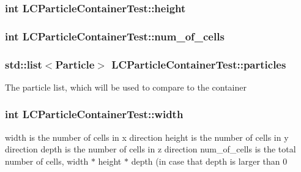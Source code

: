 \hypertarget{classLCParticleContainerTest_a4699b4535369eb36b5d711e8b45f1da6}{
\subsubsection[{height}]{\setlength{\rightskip}{0pt plus 5cm}int L\-C\-Particle\-Container\-Test\-::height\hspace{0.3cm}{\ttfamily [private]}}}\label{classLCParticleContainerTest_a4699b4535369eb36b5d711e8b45f1da6}
\hypertarget{classLCParticleContainerTest_a0d6b84232285d9630677586bb999a258}{
\subsubsection[{num\-\_\-of\-\_\-cells}]{\setlength{\rightskip}{0pt plus 5cm}int L\-C\-Particle\-Container\-Test\-::num\-\_\-of\-\_\-cells\hspace{0.3cm}{\ttfamily [private]}}}\label{classLCParticleContainerTest_a0d6b84232285d9630677586bb999a258}
\hypertarget{classLCParticleContainerTest_a9b0a10a86578860c76d2da5da0614e22}{
\subsubsection[{particles}]{\setlength{\rightskip}{0pt plus 5cm}std\-::list$<${\bf Particle}$>$ L\-C\-Particle\-Container\-Test\-::particles\hspace{0.3cm}{\ttfamily [private]}}}\label{classLCParticleContainerTest_a9b0a10a86578860c76d2da5da0614e22}
The particle list, which will be used to compare to the container \hypertarget{classLCParticleContainerTest_a72378a90a56e81786578f90afcd41b39}{
\subsubsection[{width}]{\setlength{\rightskip}{0pt plus 5cm}int L\-C\-Particle\-Container\-Test\-::width\hspace{0.3cm}{\ttfamily [private]}}}\label{classLCParticleContainerTest_a72378a90a56e81786578f90afcd41b39}
width is the number of cells in x direction height is the number of cells in y direction depth is the number of cells in z direction num\-\_\-of\-\_\-cells is the total number of cells, width $\ast$ height $\ast$ depth (in case that depth is larger than 0 

